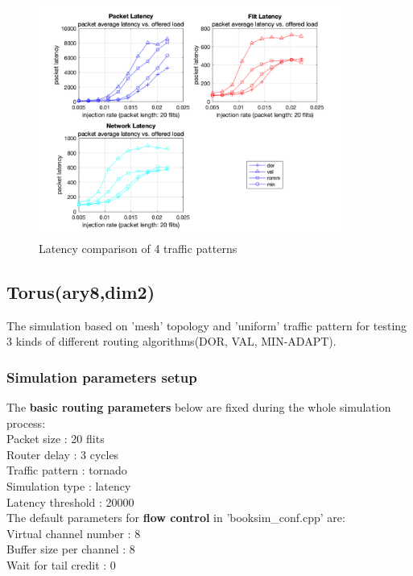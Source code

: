 \begin{figure}[H]
    \centering
    \includegraphics[width=0.9\textwidth]{Images/chap2/mesh_tornado/mesh_comparison_tornado.png}
    \caption{Latency comparison of 4 traffic patterns}
    \label{fig:com_mesh_tornado}
\end{figure}






\subsection{Torus(ary8,dim2)}

The simulation based on 'mesh' topology and 'uniform' traffic pattern for testing 3 kinds of different routing algorithms(DOR, VAL, MIN-ADAPT).
\subsubsection{Simulation parameters setup}
The \textbf{basic routing parameters} below are fixed during the whole simulation process:\\
Packet size : 20 flits\\
Router delay : 3 cycles\\
Traffic pattern : tornado\\
Simulation type : latency\\
Latency threshold : 20000\\
The default parameters for \textbf{flow control} in 'booksim\_conf.cpp' are: \\
Virtual channel number : 8\\
Buffer size per channel : 8\\
Wait for tail credit : 0\\


